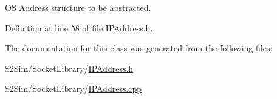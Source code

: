 O\-S Address structure to be abstracted. 



Definition at line 58 of file I\-P\-Address.\-h.



The documentation for this class was generated from the following files\-:\begin{DoxyCompactItemize}
\item 
S2\-Sim/\-Socket\-Library/\hyperlink{_i_p_address_8h}{I\-P\-Address.\-h}\item 
S2\-Sim/\-Socket\-Library/\hyperlink{_i_p_address_8cpp}{I\-P\-Address.\-cpp}\end{DoxyCompactItemize}
